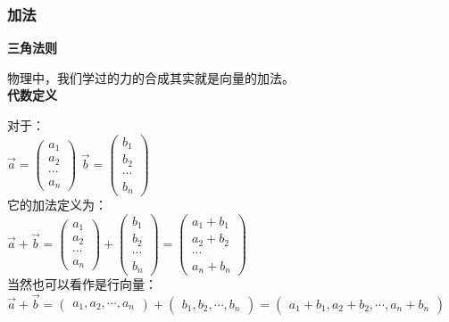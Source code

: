 \documentclass[UTF8]{ctexbook}
\begin{document}
\subsubsection{加法}

\textbf{三角法则}

物理中，我们学过的力的合成其实就是向量的加法。 \\

\textbf{代数定义}

对于：\\

$\vec{a}=\begin{pmatrix} a_{1} \\ a_{2} \\ \cdots \\ a_{n} \end{pmatrix}$  \qquad
$\vec{b}=\begin{pmatrix} b_{1} \\ b_{2} \\ \cdots \\ b_{n} \end{pmatrix}$\\

它的加法定义为：\\

$\vec{a}+\vec{b}
=\begin{pmatrix} a_{1} \\ a_{2} \\ \cdots \\ a_{n} \end{pmatrix} +
\begin{pmatrix} b_{1} \\ b_{2} \\ \cdots \\ b_{n} \end{pmatrix}
=\begin{pmatrix} a_{1}+b_{1} \\ a_{2}+b_{2} \\ \cdots \\ a_{n}+b_{n} \end{pmatrix}$\\

当然也可以看作是行向量：\\

$\vec{a}+\vec{b}=\begin{pmatrix} a_{1},a_{2},\cdots,a_{n} \end{pmatrix} +
\begin{pmatrix} b_{1},b_{2},\cdots,b_{n} \end{pmatrix}
=\begin{pmatrix} a_{1}+b_{1},a_{2}+b_{2},\cdots,a_{n}+b_{n} \end{pmatrix}$\\
\end{document}
